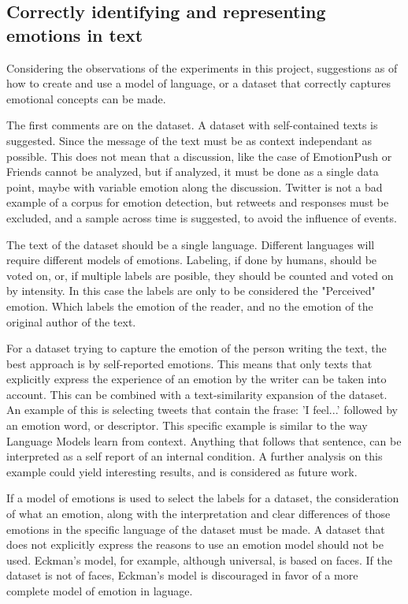 \subsection{Correctly identifying and representing emotions in text}
Considering the observations of the experiments in this project, suggestions as of how to create and use a model of language, or a dataset that correctly captures emotional concepts can be made.

The first comments are on the dataset. A dataset with self-contained texts is suggested. Since the message of the text must be as context independant as possible. This does not mean that a discussion, like the case of EmotionPush or Friends cannot be analyzed, but if analyzed, it must be done as a single data point, maybe with variable emotion along the discussion.
Twitter is not a bad example of a corpus for emotion detection, but retweets and responses must be excluded, and a sample across time is suggested, to avoid the influence of events.

The text of the dataset should be a single language. Different languages will require different models of emotions. Labeling, if done by humans, should be voted on, or, if multiple labels are posible, they should be counted and voted on by intensity. In this case the labels are only to be considered the "Perceived" emotion. Which labels the emotion of the reader, and no the emotion of the original author of the text.

For a dataset trying to capture the emotion of the person writing the text, the best approach is by self-reported emotions. This means that only texts that explicitly express the experience of an emotion by the writer can be taken into account. This can be combined with a text-similarity expansion of the dataset. An example of this is selecting tweets that contain the frase: 'I feel...' followed by an emotion word, or descriptor. This specific example is similar to the way Language Models learn from context. Anything that follows that sentence, can be interpreted as a self report of an internal condition. A further analysis on this example could yield interesting results, and is considered as future work.

If a model of emotions is used to select the labels for a dataset, the consideration of what an emotion, along with the interpretation and clear differences of those emotions in the specific language of the dataset must be made. A dataset that does not explicitly express the reasons to use an emotion model should not be used. Eckman's model, for example, although universal, is based on faces. If the dataset is not of faces, Eckman's model is discouraged in favor of a more complete model of emotion in laguage.

